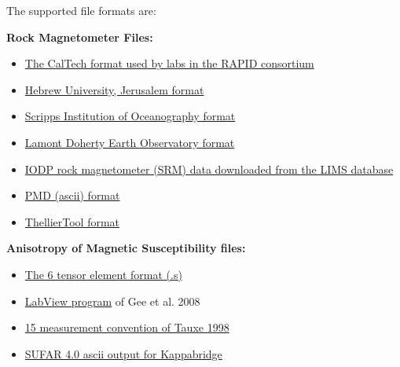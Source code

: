\documentclass[11pt]{book}
\begin{document}
{The supported file formats are:

{\bf Rock Magnetometer Files:}

\begin{itemize}
\item \href{#cit_magic.py}{The CalTech format used by labs in the RAPID consortium}
\item \href{#huji_magic.py}{Hebrew University, Jerusalem format}
\item \href{#sio_magic.py}{Scripps Institution of Oceanography format}
\item \href{#ldeo_magic.py}{Lamont Doherty Earth Observatory format}
\item \href{#iodp_csv_magic.py}{IODP rock magnetometer (SRM) data downloaded from the LIMS database}
\item \href{#pmd_magic.py}{PMD (ascii) format}
\item \href{#tdt_magic.py}{ThellierTool format}
\end{itemize}


{\bf Anisotropy of Magnetic Susceptibility files:}

\begin{itemize}
\item \href{#s_magic.py}{The 6 tensor element format (.s)}
\item \href{#KLY4S_magic.py}{LabView program} of Gee et al. 2008 \nocite{gee08}
\item \href{#k15\_magic.py}{15 measurement convention of Tauxe 1998 \nocite{tauxe98}}
\item \href{#SUFAR4-asc\_magic.py}{SUFAR 4.0 ascii output for Kappabridge}
\end{itemize}

}
\end{document}
